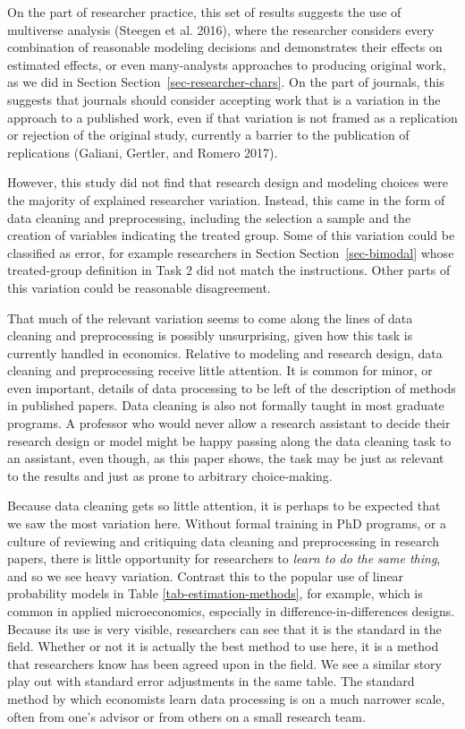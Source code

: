 \documentclass[
  letterpaper,
  DIV=11,
  numbers=noendperiod]{scrartcl}
\begin{document}
On the part of researcher practice, this set of results suggests the use
of multiverse analysis (Steegen et al. 2016), where the researcher
considers every combination of reasonable modeling decisions and
demonstrates their effects on estimated effects, or even many-analysts
approaches to producing original work, as we did in Section
Section~\ref{sec-researcher-chars}. On the part of journals, this
suggests that journals should consider accepting work that is a
variation in the approach to a published work, even if that variation is
not framed as a replication or rejection of the original study,
currently a barrier to the publication of replications (Galiani,
Gertler, and Romero 2017).

However, this study did not find that research design and modeling
choices were the majority of explained researcher variation. Instead,
this came in the form of data cleaning and preprocessing, including the
selection a sample and the creation of variables indicating the treated
group. Some of this variation could be classified as error, for example
researchers in Section Section~\ref{sec-bimodal} whose treated-group
definition in Task 2 did not match the instructions. Other parts of this
variation could be reasonable disagreement.

That much of the relevant variation seems to come along the lines of
data cleaning and preprocessing is possibly unsurprising, given how this
task is currently handled in economics. Relative to modeling and
research design, data cleaning and preprocessing receive little
attention. It is common for minor, or even important, details of data
processing to be left of the description of methods in published papers.
Data cleaning is also not formally taught in most graduate programs. A
professor who would never allow a research assistant to decide their
research design or model might be happy passing along the data cleaning
task to an assistant, even though, as this paper shows, the task may be
just as relevant to the results and just as prone to arbitrary
choice-making.

Because data cleaning gets so little attention, it is perhaps to be
expected that we saw the most variation here. Without formal training in
PhD programs, or a culture of reviewing and critiquing data cleaning and
preprocessing in research papers, there is little opportunity for
researchers to \emph{learn to do the same thing}, and so we see heavy
variation. Contrast this to the popular use of linear probability models
in Table \ref{tab-estimation-methods}, for example, which is common in
applied microeconomics, especially in difference-in-differences designs.
Because its use is very visible, researchers can see that it is the
standard in the field. Whether or not it is actually the best method to
use here, it is a method that researchers know has been agreed upon in
the field. We see a similar story play out with standard error
adjustments in the same table. The standard method by which economists
learn data processing is on a much narrower scale, often from one's
advisor or from others on a small research team.
\end{document}
